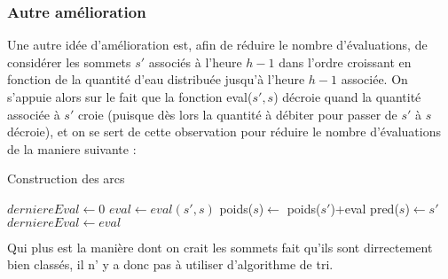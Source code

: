 \documentclass[a4paper]{report}
\begin{document}
\subsubsection*{Autre amélioration } Une autre idée d'amélioration est, afin de réduire le nombre d'évaluations, de considérer les sommets $s'$ associés à l'heure $h-1$ dans l'ordre croissant en fonction de la quantité d'eau distribuée jusqu'à l'heure $h-1$ associée. On s'appuie alors sur le fait que la fonction eval($s',s$) décroie quand la quantité associée à $s'$ croie (puisque dès lors la quantité à débiter pour passer de $s'$ à $s$ décroie), et on se sert de cette observation pour réduire le nombre d'évaluations de la maniere suivante :\\
 \begin{algorithm}[H]
 \caption{Construction des arcs}
 
 
 \begin{algorithmic}

\STATE $derniereEval \longleftarrow 0$
\STATE $eval\longleftarrow eval(s',s)$
 \STATE poids($s$)$\longleftarrow$ poids($s'$)+eval
\STATE pred($s$)$\longleftarrow s'$
\STATE $derniereEval\longleftarrow eval$
 \ENDIF
\ENDIF

 \ENDFOR

 

 \end{algorithmic}
 \end{algorithm}
Qui plus est la manière dont on crait les sommets fait qu'ils sont dirrectement bien classés, il n' y a donc pas à utiliser d'algorithme de tri.\\
\end{document}
